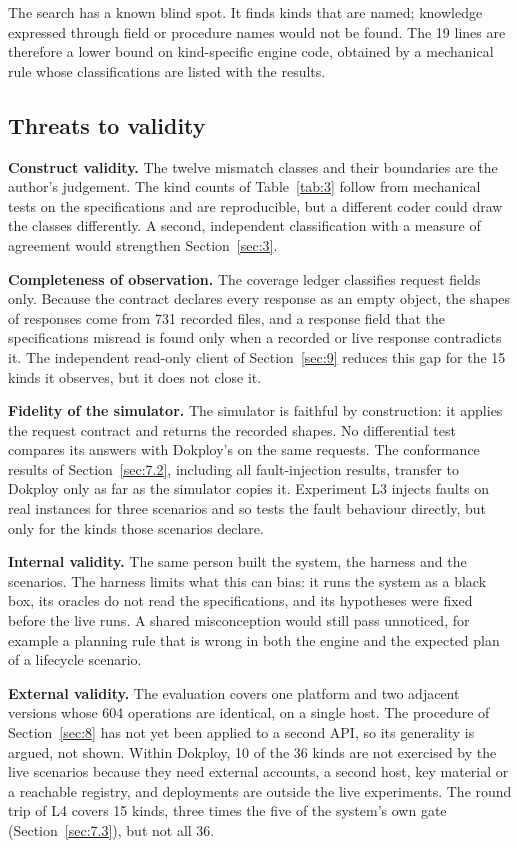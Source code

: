 The search has a known blind spot. It finds kinds that are named; knowledge expressed through field or
procedure names would not be found. The 19 lines are therefore a lower bound on kind-specific engine
code, obtained by a mechanical rule whose classifications are listed with the results.

\subsection{Threats to validity}\label{sec:10.3}

\textbf{Construct validity.} The twelve mismatch classes and their boundaries are the author's judgement.
The kind counts of Table~\ref{tab:3} follow from mechanical tests on the specifications and are reproducible,
but a different coder could draw the classes differently. A second, independent classification with
a measure of agreement would strengthen Section~\ref{sec:3}.

\textbf{Completeness of observation.} The coverage ledger classifies request fields only. Because the
contract declares every response as an empty object, the shapes of responses come from 731 recorded
files, and a response field that the specifications misread is found only when a recorded or live
response contradicts it. The independent read-only client of Section~\ref{sec:9} reduces this gap for the 15 kinds it observes, but it does not close it.

\textbf{Fidelity of the simulator.} The simulator is faithful by construction: it applies the request
contract and returns the recorded shapes. No differential test compares its answers with Dokploy's on
the same requests. The conformance results of Section~\ref{sec:7.2}, including all fault-injection results,
transfer to Dokploy only as far as the simulator copies it. Experiment L3 injects faults on real
instances for three scenarios and so tests the fault behaviour directly, but only for the kinds those
scenarios declare. 

\textbf{Internal validity.} The same person built the system, the harness and the scenarios. The harness
limits what this can bias: it runs the system as a black box, its oracles do not read the
specifications, and its hypotheses were fixed before the live runs. A shared misconception would
still pass unnoticed, for example a planning rule that is wrong in both the engine and the expected
plan of a lifecycle scenario.

\textbf{External validity.} The evaluation covers one platform and two adjacent versions whose 604
operations are identical, on a single host. The procedure of Section~\ref{sec:8} has not yet been applied to a
second API, so its generality is argued, not shown. Within Dokploy, 10 of the 36 kinds are not
exercised by the live scenarios because they need external accounts, a second host, key material or
a reachable registry, and deployments are outside the live experiments. The round trip of L4 covers 15 kinds, three times
the five of the system's own gate (Section~\ref{sec:7.3}), but not all 36.

